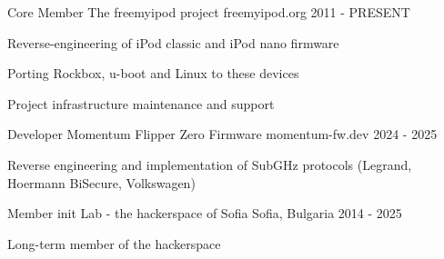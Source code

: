 

\begin{cventries}

  \cventry
    {Core Member} %
    {The freemyipod project} %
    {freemyipod.org} %
    {2011 - PRESENT} %
    {
      \begin{cvitems} %
        \item {Reverse-engineering of iPod classic and iPod nano firmware}
        \item {Porting Rockbox, u-boot and Linux to these devices}
        \item {Project infrastructure maintenance and support}
      \end{cvitems}
    }

  \cventry
    {Developer} %
    {Momentum Flipper Zero Firmware} %
    {momentum-fw.dev} %
    {2024 - 2025} %
    {
      \begin{cvitems} %
        \item {Reverse engineering and implementation of SubGHz protocols (Legrand, Hoermann BiSecure, Volkswagen)}
      \end{cvitems}
    }

  \cventry
    {Member} %
    {init Lab - the hackerspace of Sofia} %
    {Sofia, Bulgaria} %
    {2014 - 2025} %
    {
      \begin{cvitems} %
        \item {Long-term member of the hackerspace}
      \end{cvitems}
    }

\end{cventries}
